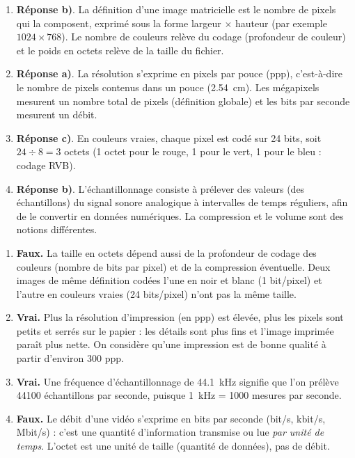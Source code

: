 \documentclass[11pt]{article}
\begin{document}
\begin{corrige}
\begin{enumerate}
\item \textbf{Réponse b)}. La définition d'une image matricielle est le nombre de pixels qui la composent, exprimé sous la forme largeur $\times$ hauteur (par exemple $1024 \times 768$). Le nombre de couleurs relève du codage (profondeur de couleur) et le poids en octets relève de la taille du fichier.
\item \textbf{Réponse a)}. La résolution s'exprime en pixels par pouce (ppp), c'est-à-dire le nombre de pixels contenus dans un pouce (\SI{2,54}{cm}). Les mégapixels mesurent un nombre total de pixels (définition globale) et les bits par seconde mesurent un débit.
\item \textbf{Réponse c)}. En couleurs vraies, chaque pixel est codé sur 24 bits, soit $24 \div 8 = 3$ octets (1 octet pour le rouge, 1 pour le vert, 1 pour le bleu : codage RVB).
\item \textbf{Réponse b)}. L'échantillonnage consiste à prélever des valeurs (des échantillons) du signal sonore analogique à intervalles de temps réguliers, afin de le convertir en données numériques. La compression et le volume sont des notions différentes.
\end{enumerate}
\end{corrige}

\begin{corrige}
\begin{enumerate}
\item \textbf{Faux.} La taille en octets dépend aussi de la profondeur de codage des couleurs (nombre de bits par pixel) et de la compression éventuelle. Deux images de même définition codées l'une en noir et blanc (1 bit/pixel) et l'autre en couleurs vraies (24 bits/pixel) n'ont pas la même taille.
\item \textbf{Vrai.} Plus la résolution d'impression (en ppp) est élevée, plus les pixels sont petits et serrés sur le papier : les détails sont plus fins et l'image imprimée paraît plus nette. On considère qu'une impression est de bonne qualité à partir d'environ 300 ppp.
\item \textbf{Vrai.} Une fréquence d'échantillonnage de \SI{44,1}{kHz} signifie que l'on prélève \num{44100} échantillons par seconde, puisque \SI{1}{kHz} = \num{1000} mesures par seconde.
\item \textbf{Faux.} Le débit d'une vidéo s'exprime en bits par seconde (bit/s, kbit/s, Mbit/s) : c'est une quantité d'information transmise ou lue \emph{par unité de temps}. L'octet est une unité de taille (quantité de données), pas de débit.
\end{enumerate}
\end{corrige}
\end{document}
